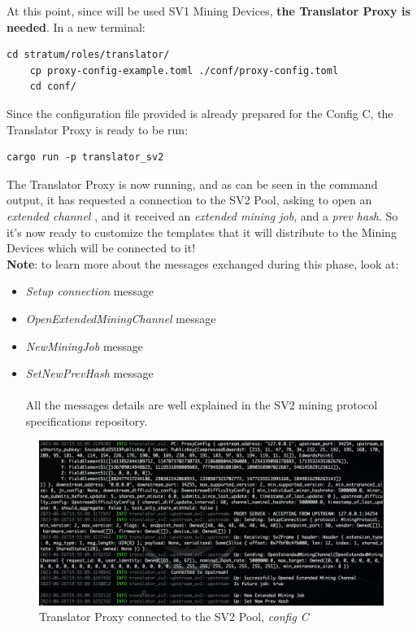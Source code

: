 \newline
\noindent At this point, since will be used SV1 Mining Devices, \textbf{the Translator Proxy is needed}. In a new terminal:
\begin{lstlisting}[style=bashStyle, numbers=none]
    cd stratum/roles/translator/
    cp proxy-config-example.toml ./conf/proxy-config.toml
    cd conf/
\end{lstlisting}
Since the configuration file provided is already prepared for the Config C, the Translator Proxy is ready to be run:
\begin{lstlisting}[style=bashStyle, numbers=none]
    cargo run -p translator_sv2 
\end{lstlisting}
The Translator Proxy is now running, and as can be seen in the command output, it has requested a connection to the SV2 Pool, asking to open an \textit{extended channel} \cite{githubSv2spec05MiningProtocolmdMain}, and it received an \textit{extended mining job}, and a \textit{prev hash}. So it's now ready to customize the templates that it will distribute to the Mining Devices which will be connected to it!\\   

\textbf{Note}: to learn more about the messages exchanged during this phase, look at:
\begin{itemize}
    \item \textit{Setup connection} message
    \item \textit{OpenExtendedMiningChannel} message
    \item \textit{NewMiningJob} message 
    \item \textit{SetNewPrevHash} message\\\\
    All the messages details are well explained in the SV2 mining protocol specifications repository.
\end{itemize}
\begin{figure}[h!]
    \centering
    \includegraphics[width=15cm]{Figures/sri/configC_2.png}
    \caption{Translator Proxy connected to the SV2 Pool, \textit{config C}}
    \label{fig:configC_2}
\end{figure}


